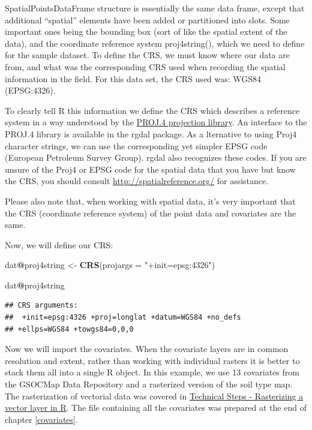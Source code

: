 \documentclass[10pt,b5paper,]{book}
\newenvironment{Shaded}{\begin{snugshade}}{\end{snugshade}}
\newcommand{\DataTypeTok}[1]{\textcolor[rgb]{0.13,0.29,0.53}{#1}}
\newcommand{\KeywordTok}[1]{\textcolor[rgb]{0.13,0.29,0.53}{\textbf{#1}}}
\newcommand{\NormalTok}[1]{#1}
\newcommand{\OperatorTok}[1]{\textcolor[rgb]{0.81,0.36,0.00}{\textbf{#1}}}
\newcommand{\StringTok}[1]{\textcolor[rgb]{0.31,0.60,0.02}{#1}}
\theoremstyle{definition}
\theoremstyle{definition}
\theoremstyle{definition}
\theoremstyle{remark}
\begin{document}
SpatialPointsDataFrame structure is essentially the same data frame,
except that additional ``spatial'' elements have been added or
partitioned into slots. Some important ones being the bounding box (sort
of like the spatial extent of the data), and the coordinate reference
system proj4string(), which we need to define for the sample dataset. To
define the CRS, we must know where our data are from, and what was the
corresponding CRS used when recording the spatial information in the
field. For this data set, the CRS used was: WGS84 (EPSG:4326).

To clearly tell R this information we define the CRS which describes a
reference system in a way understood by the
\href{http://trac.osgeo.org/proj/}{PROJ.4 projection library}. An
interface to the PROJ.4 library is available in the rgdal package. As a
lternative to using Proj4 character strings, we can use the
corresponding yet simpler EPSG code (European Petroleum Survey Group).
rgdal also recognizes these codes. If you are unsure of the Proj4 or
EPSG code for the spatial data that you have but know the CRS, you
should consult \url{http://spatialreference.org/} for assistance.

Please also note that, when working with spatial data, it's very
important that the CRS (coordinate reference system) of the point data
and covariates are the same.

Now, we will define our CRS:

\begin{Shaded}
\begin{Highlighting}[]
\NormalTok{dat}\OperatorTok{@}\NormalTok{proj4string <-}\StringTok{ }\KeywordTok{CRS}\NormalTok{(}\DataTypeTok{projargs =} \StringTok{"+init=epsg:4326"}\NormalTok{)}

\NormalTok{dat}\OperatorTok{@}\NormalTok{proj4string}
\end{Highlighting}
\end{Shaded}

\begin{verbatim}
## CRS arguments:
##  +init=epsg:4326 +proj=longlat +datum=WGS84 +no_defs
## +ellps=WGS84 +towgs84=0,0,0
\end{verbatim}

Now we will import the covariates. When the covariate layers are in
common resolution and extent, rather than working with individual
rasters it is better to stack them all into a single R object. In this
example, we use 13 covariates from the GSOCMap Data Repository and a
rasterized version of the soil type map. The rasterization of vectorial
data was covered in
\protect\hyperlink{technical-steps---rasterizing-a-vector-layer-in-r}{Technical
Steps - Rasterizing a vector layer in R}. The file containing all the
covariates was prepared at the end of chapter \ref{covariates}.
\end{document}
